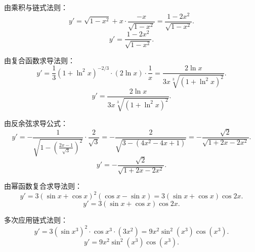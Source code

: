 \begin{solution}

    由乘积与链式法则：
    \begin{equation}
        y' = \sqrt{1-x^2} + x \cdot \frac{-x}{\sqrt{1-x^2}} = \frac{1-2x^2}{\sqrt{1-x^2}}.
    \end{equation}
    \begin{equation}
        \boxed{y' = \frac{1-2x^2}{\sqrt{1-x^2}}.}
    \end{equation}


    由复合函数求导法则：
    \begin{equation}
        y' = \frac{1}{3}(1+\ln^2 x)^{-2/3} \cdot (2\ln x) \cdot \frac{1}{x} = \frac{2\ln x}{3x\sqrt[3]{(1+\ln^2 x)^2}}.
    \end{equation}
    \begin{equation}
        \boxed{y' = \frac{2\ln x}{3x\sqrt[3]{(1+\ln^2 x)^2}}.}
    \end{equation}


    由反余弦求导公式：
    \begin{equation}
        y' = -\frac{1}{\sqrt{1 - \left(\frac{2x-1}{\sqrt{3}}\right)^2}} \cdot \frac{2}{\sqrt{3}} = -\frac{2}{\sqrt{3 - (4x^2 - 4x + 1)}} = -\frac{\sqrt{2}}{\sqrt{1 + 2x - 2x^2}}.
    \end{equation}
    \begin{equation}
        \boxed{y' = -\frac{\sqrt{2}}{\sqrt{1 + 2x - 2x^2}}.}
    \end{equation}


    由幂函数复合求导法则：
    \begin{equation}
        y' = 3(\sin x + \cos x)^2 (\cos x - \sin x) = 3(\sin x + \cos x)\cos 2x.
    \end{equation}
    \begin{equation}
        \boxed{y' = 3(\sin x + \cos x)\cos 2x.}
    \end{equation}


    多次应用链式法则：
    \begin{equation}
        y' = 3(\sin x^3)^2 \cdot \cos x^3 \cdot (3x^2) = 9x^2 \sin^2(x^3)\cos(x^3).
    \end{equation}
    \begin{equation}
        \boxed{y' = 9x^2 \sin^2(x^3)\cos(x^3).}
    \end{equation}


\end{solution}
